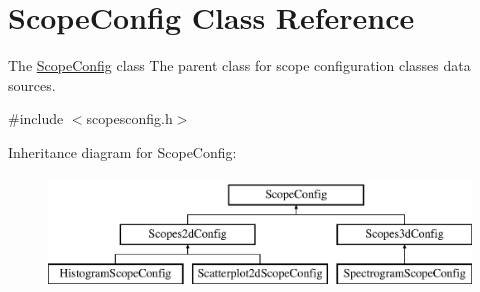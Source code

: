 \hypertarget{class_scope_config}{\section{\-Scope\-Config \-Class \-Reference}
\label{class_scope_config}
}


\-The \hyperlink{class_scope_config}{\-Scope\-Config} class \-The parent class for scope configuration classes data sources.  




{\ttfamily \#include $<$scopesconfig.\-h$>$}

\-Inheritance diagram for \-Scope\-Config\-:\begin{figure}[H]
\begin{center}
\leavevmode
\includegraphics[height=3.000000cm]{class_scope_config}
\end{center}
\end{figure}
